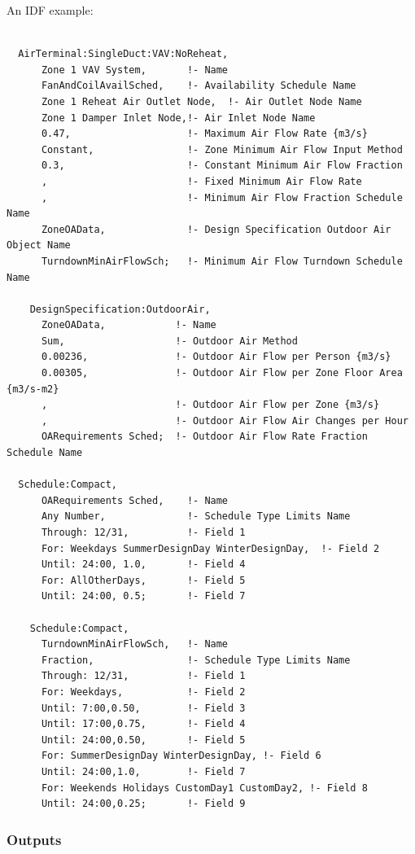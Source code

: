 An IDF example:

\begin{lstlisting}

  AirTerminal:SingleDuct:VAV:NoReheat,
      Zone 1 VAV System,       !- Name
      FanAndCoilAvailSched,    !- Availability Schedule Name
      Zone 1 Reheat Air Outlet Node,  !- Air Outlet Node Name
      Zone 1 Damper Inlet Node,!- Air Inlet Node Name
      0.47,                    !- Maximum Air Flow Rate {m3/s}
      Constant,                !- Zone Minimum Air Flow Input Method
      0.3,                     !- Constant Minimum Air Flow Fraction
      ,                        !- Fixed Minimum Air Flow Rate
      ,                        !- Minimum Air Flow Fraction Schedule Name
      ZoneOAData,              !- Design Specification Outdoor Air Object Name
      TurndownMinAirFlowSch;   !- Minimum Air Flow Turndown Schedule Name

    DesignSpecification:OutdoorAir,
      ZoneOAData,            !- Name
      Sum,                   !- Outdoor Air Method
      0.00236,               !- Outdoor Air Flow per Person {m3/s}
      0.00305,               !- Outdoor Air Flow per Zone Floor Area {m3/s-m2}
      ,                      !- Outdoor Air Flow per Zone {m3/s}
      ,                      !- Outdoor Air Flow Air Changes per Hour
      OARequirements Sched;  !- Outdoor Air Flow Rate Fraction Schedule Name

  Schedule:Compact,
      OARequirements Sched,    !- Name
      Any Number,              !- Schedule Type Limits Name
      Through: 12/31,          !- Field 1
      For: Weekdays SummerDesignDay WinterDesignDay,  !- Field 2
      Until: 24:00, 1.0,       !- Field 4
      For: AllOtherDays,       !- Field 5
      Until: 24:00, 0.5;       !- Field 7

    Schedule:Compact,
      TurndownMinAirFlowSch,   !- Name
      Fraction,                !- Schedule Type Limits Name
      Through: 12/31,          !- Field 1
      For: Weekdays,           !- Field 2
      Until: 7:00,0.50,        !- Field 3
      Until: 17:00,0.75,       !- Field 4
      Until: 24:00,0.50,       !- Field 5
      For: SummerDesignDay WinterDesignDay, !- Field 6
      Until: 24:00,1.0,        !- Field 7
      For: Weekends Holidays CustomDay1 CustomDay2, !- Field 8
      Until: 24:00,0.25;       !- Field 9
\end{lstlisting}

\subsubsection{Outputs}\label{outputs-5}

